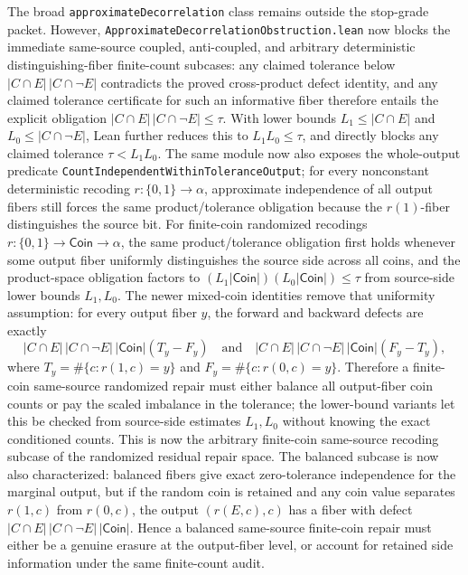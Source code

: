 \documentclass[11pt]{article}
\theoremstyle{remark}
\begin{document}
The broad \texttt{approximateDecorrelation} class remains outside the stop-grade
packet.  However, \texttt{ApproximateDecorrelationObstruction.lean} now blocks
the immediate same-source coupled, anti-coupled, and arbitrary deterministic
distinguishing-fiber finite-count subcases: any claimed tolerance below
\(|C\cap E|\,|C\cap\neg E|\) contradicts the proved cross-product defect
identity, and any claimed tolerance certificate for such an informative fiber
therefore entails the explicit obligation
\(|C\cap E|\,|C\cap\neg E|\le\tau\).  With lower bounds
\(L_1\le |C\cap E|\) and \(L_0\le |C\cap\neg E|\), Lean further reduces this
to \(L_1L_0\le\tau\), and directly blocks any claimed tolerance
\(\tau<L_1L_0\).  The same module now also exposes the whole-output predicate
\texttt{CountIndependentWithinToleranceOutput}; for every nonconstant
deterministic recoding \(r:\{0,1\}\to\alpha\), approximate independence of all
output fibers still forces the same product/tolerance obligation because the
\(r(1)\)-fiber distinguishes the source bit.  For finite-coin randomized
recodings \(r:\{0,1\}\to\mathsf{Coin}\to\alpha\), the same product/tolerance
obligation first holds whenever some output fiber uniformly distinguishes the
source side across all coins, and the product-space obligation factors to
\((L_1|\mathsf{Coin}|)(L_0|\mathsf{Coin}|)\le\tau\) from source-side lower
bounds \(L_1,L_0\).  The newer mixed-coin identities remove that uniformity
assumption: for every output fiber \(y\), the forward and backward defects are
exactly
\[
  |C\cap E|\,|C\cap\neg E|\,|\mathsf{Coin}|(T_y-F_y)
  \quad\text{and}\quad
  |C\cap E|\,|C\cap\neg E|\,|\mathsf{Coin}|(F_y-T_y),
\]
where \(T_y=\#\{c:r(1,c)=y\}\) and \(F_y=\#\{c:r(0,c)=y\}\).  Therefore a
finite-coin same-source randomized repair must either balance all output-fiber
coin counts or pay the scaled imbalance in the tolerance; the lower-bound
variants let this be checked from source-side estimates \(L_1,L_0\) without
knowing the exact conditioned counts.  This is now the arbitrary finite-coin
same-source recoding subcase of the randomized residual repair space.  The
balanced subcase is now also characterized: balanced fibers give exact
zero-tolerance independence for the marginal output, but if the random coin is
retained and any coin value separates \(r(1,c)\) from \(r(0,c)\), the output
\((r(E,c),c)\) has a fiber with defect
\(|C\cap E|\,|C\cap\neg E|\,|\mathsf{Coin}|\).  Hence a balanced same-source
finite-coin repair must either be a genuine erasure at the output-fiber level,
or account for retained side information under the same finite-count audit.
\end{document}
